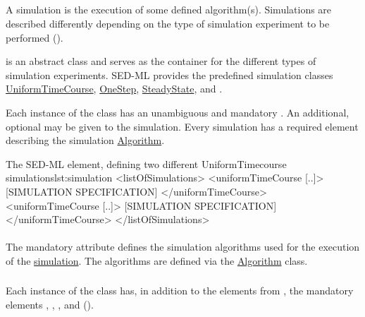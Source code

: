 \subsection{}
\label{class:simulation}
A simulation is the execution of some defined algorithm(s). Simulations are described differently depending on the type of simulation experiment to be performed (). 


 is an abstract class and serves as the container for the different types of simulation experiments. SED-ML \currentLV provides the predefined simulation classes \hyperref[class:uniformTimeCourse]{UniformTimeCourse}, \hyperref[class:oneStep]{OneStep}, \hyperref[class:steadyState]{SteadyState}, and \Analysis. 

Each instance of the  class has an unambiguous and mandatory \hyperref[sec:id]{}. An additional, optional \hyperref[sec:name]{} may be given to the simulation. Every simulation has a required element \hyperref[class:algorithm]{} describing the simulation \hyperref[class:algorithm]{Algorithm}.

\begin{myXmlLst}{The SED-ML  element, defining two different UniformTimecourse simulations}{lst:simulation}
<listOfSimulations>
	<uniformTimeCourse [..]>
		[SIMULATION SPECIFICATION]
	</uniformTimeCourse>
	<uniformTimeCourse [..]>
		[SIMULATION SPECIFICATION]
	</uniformTimeCourse>
</listOfSimulations>
\end{myXmlLst}

\paragraph*{}
\label{sec:algorithm}
The mandatory attribute  defines the simulation algorithms used for the execution of the \hyperref[class:simulation]{simulation}. The algorithms are defined via the \hyperref[class:algorithm]{Algorithm} class.


\subsubsection{}
\label{class:uniformTimeCourse}
Each instance of the  class has, in addition to the elements from \Simulation, the mandatory elements \hyperref[sec:initialTime]{}, \hyperref[sec:outputStartTime]{}, \hyperref[sec:outputEndTime]{}, and \hyperref[sec:numberOfSteps]{} ().

